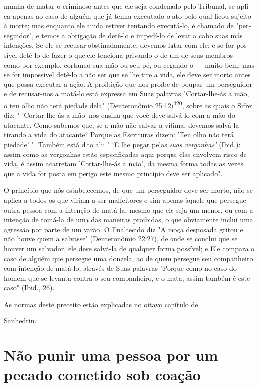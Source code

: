 \begin{itemize}
\begin{enumrate}
\begin{itemize}
\begin{itemize}
\begin{itemize}
munha de matar o criminoso antes que ele seja condenado pelo Tribunal,
se apli­ca apenas ao caso de alguém que já tenha executado o ato pelo
qual ficou sujeito à morte; mas enquanto ele ainda estiver tentando
executá-lo, é chamado de "per­seguidor", e temos a obrigação de detê-lo
e impedí-lo de levar a cabo suas más intenções. Se ele se recusar
obstinadamente, devemos lutar com ele; e se for pos­sível detê-lo de
fazer o que ele tenciona privando-o de um de seus membros ---como por
exemplo, cortando sua mão ou seu pé, ou cegando-o --- muito bem; mas se
for impossível detê-lo a não ser que se lhe tire a vida, ele deve ser
morto antes que possa executar a ação. A proibição que nos proíbe de
poupar um per­seguidor e de recusar-nos a matá-lo está expressa em Suas
palavras "Cortar-lhe-ás a mão, o teu olho não terá piedade dela"
(Deuteronômio 25:12)\textsuperscript{420}, sobre as quais o Sifrei diz:
" 'Cortar-lhe-ás a mão' nos ensina que você deve salvá-lo com a mão do
atacante. Como sabemos que, se a mão não salvar a vítima, devemos
salvá-la tirando a vida do atacante? Porque as Escrituras dizem: 'Teu
olho não terá piedade' ". Também está dito ali: " `E lhe pegar pelas
\emph{suas vergonhas'} (Ibid.): assim como as vergonhas estão
especificadas aqui porque elas envolvem risco de vida, é assim acarretam
'Cortar-lhe-ás a mão', da mesma forma todas as vezes que a vida for
posta em perigo este mesmo princípio deve ser aplicado".

O princípio que nós estabelecemos, de que um perseguidor deve ser morto,
não se aplica a todos os que viriam a ser malfeitores e sim apenas
àquele que persegue outra pessoa com a intenção de matá-la, mesmo que
ele seja um menor, ou com a intenção de tomá-la de uma das maneiras
proibidas, o que obviamente inclui uma agressão por parte de um varão. O
Enaltecido diz "A moça desposada gritou e não houve quem a salvasse"
(Deuteronômio 22:27), de onde se conclui que se houver um salvador, ele
deve salvá-la de qualquer forma possível; e Ele compara o caso de alguém
que persegue uma donzela, ao de quem persegue seu companheiro com
intenção de matá-lo, através de Suas palavras "Porque como no caso do
homem que se levanta contra o seu companheiro, e o mata, assim também é
este caso" (Ibid., 26).


As normas deste preceito estão explicadas no oitavo capítulo de


Sanhedrin.

\section{Não punir uma pessoa por um pecado cometido sob coação}


\end{itemize}
\end{itemize}
\end{itemize}
\end{enumrate}
\end{itemize}
